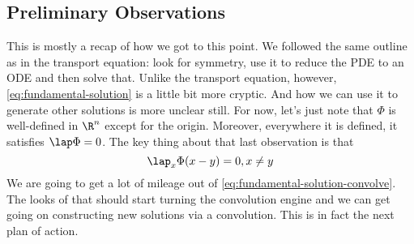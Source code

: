 \documentclass{bkcnotes}
\begin{document}
\subsection{Preliminary Observations}
This is mostly a recap of how we got to this point. We followed the
same outline as in the transport equation: look for symmetry, use it
to reduce the PDE to an ODE and then solve that. Unlike the transport
equation, however, \eqref{eq:fundamental-solution} is a little bit
more cryptic. And how we can use it to generate other solutions is
more unclear still. For now, let's just note that $\Phi$ is
well-defined in $\R^n$ except for the origin. Moreover, everywhere it
is defined, it satisfies $\lap \Phi = 0$. The key thing about that
last observation is that
\begin{equation}
  \label{eq:fundamental-solution-convolve}
  \lap_x\Phi(x-y) = 0, x\neq y
\end{equation}
We are going to get a lot of mileage out of
\eqref{eq:fundamental-solution-convolve}. The looks of that should
start turning the convolution engine and we can get going on
constructing new solutions via a convolution. This is in fact the next
plan of action.
\end{document}
